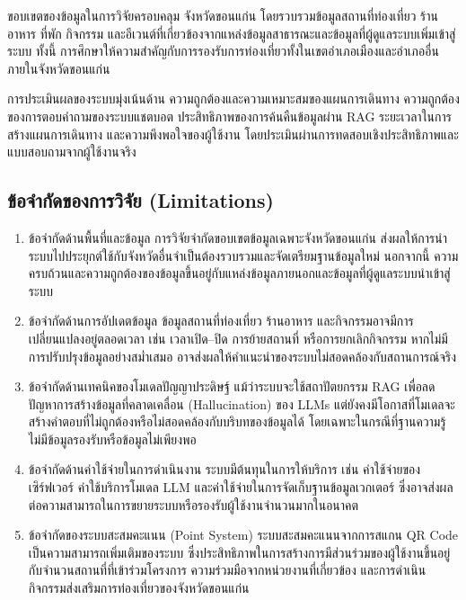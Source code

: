 ขอบเขตของข้อมูลในการวิจัยครอบคลุม จังหวัดขอนแก่น โดยรวบรวมข้อมูลสถานที่ท่องเที่ยว ร้านอาหาร ที่พัก กิจกรรม และอีเวนต์ที่เกี่ยวข้องจากแหล่งข้อมูลสาธารณะและข้อมูลที่ผู้ดูแลระบบเพิ่มเข้าสู่ระบบ ทั้งนี้ การศึกษาให้ความสำคัญกับการรองรับการท่องเที่ยวทั้งในเขตอำเภอเมืองและอำเภออื่นภายในจังหวัดขอนแก่น

การประเมินผลของระบบมุ่งเน้นด้าน ความถูกต้องและความเหมาะสมของแผนการเดินทาง ความถูกต้องของการตอบคำถามของระบบแชตบอต ประสิทธิภาพของการค้นคืนข้อมูลผ่าน RAG ระยะเวลาในการสร้างแผนการเดินทาง และความพึงพอใจของผู้ใช้งาน โดยประเมินผ่านการทดสอบเชิงประสิทธิภาพและแบบสอบถามจากผู้ใช้งานจริง

\subsection{ข้อจำกัดของการวิจัย (Limitations)}

\begin{enumerate}[leftmargin=1.8cm]
\item ข้อจำกัดด้านพื้นที่และข้อมูล การวิจัยจำกัดขอบเขตข้อมูลเฉพาะจังหวัดขอนแก่น ส่งผลให้การนำระบบไปประยุกต์ใช้กับจังหวัดอื่นจำเป็นต้องรวบรวมและจัดเตรียมฐานข้อมูลใหม่ นอกจากนี้ ความครบถ้วนและความถูกต้องของข้อมูลขึ้นอยู่กับแหล่งข้อมูลภายนอกและข้อมูลที่ผู้ดูแลระบบนำเข้าสู่ระบบ
\item ข้อจำกัดด้านการอัปเดตข้อมูล ข้อมูลสถานที่ท่องเที่ยว ร้านอาหาร และกิจกรรมอาจมีการเปลี่ยนแปลงอยู่ตลอดเวลา เช่น เวลาเปิด--ปิด การย้ายสถานที่ หรือการยกเลิกกิจกรรม หากไม่มีการปรับปรุงข้อมูลอย่างสม่ำเสมอ อาจส่งผลให้คำแนะนำของระบบไม่สอดคล้องกับสถานการณ์จริง
\item ข้อจำกัดด้านเทคนิคของโมเดลปัญญาประดิษฐ์ แม้ว่าระบบจะใช้สถาปัตยกรรม RAG เพื่อลดปัญหาการสร้างข้อมูลที่คลาดเคลื่อน (Hallucination) ของ LLMs แต่ยังคงมีโอกาสที่โมเดลจะสร้างคำตอบที่ไม่ถูกต้องหรือไม่สอดคล้องกับบริบทของข้อมูลได้ โดยเฉพาะในกรณีที่ฐานความรู้ไม่มีข้อมูลรองรับหรือข้อมูลไม่เพียงพอ
\item ข้อจำกัดด้านค่าใช้จ่ายในการดำเนินงาน ระบบมีต้นทุนในการให้บริการ เช่น ค่าใช้จ่ายของเซิร์ฟเวอร์ ค่าใช้บริการโมเดล LLM และค่าใช้จ่ายในการจัดเก็บฐานข้อมูลเวกเตอร์ ซึ่งอาจส่งผลต่อความสามารถในการขยายระบบหรือรองรับผู้ใช้งานจำนวนมากในอนาคต
\item ข้อจำกัดของระบบสะสมคะแนน (Point System) ระบบสะสมคะแนนจากการสแกน QR Code เป็นความสามารถเพิ่มเติมของระบบ ซึ่งประสิทธิภาพในการสร้างการมีส่วนร่วมของผู้ใช้งานขึ้นอยู่กับจำนวนสถานที่ที่เข้าร่วมโครงการ ความร่วมมือจากหน่วยงานที่เกี่ยวข้อง และการดำเนินกิจกรรมส่งเสริมการท่องเที่ยวของจังหวัดขอนแก่น
\end{enumerate}
